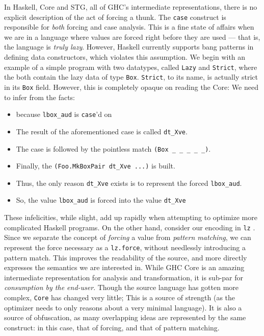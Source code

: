 \documentclass[sigplan,\review anonymous]{acmart}
\newcommand{\raw}[1]{\texttt{#1}}
\newcommand{\lz}{\texttt{lz} }
\newcommand{\core}{\texttt{Core} }
\begin{document}
In Haskell, Core and STG, all of GHC's intermediate representations, there is
no explicit description of the act of forcing a thunk. The \texttt{case} construct
is responsible for \emph{both} forcing and case analysis. This is a fine state
of affairs when we are in a language where values are forced right before they
are used --- that is, the language is \emph{truly lazy}. However, Haskell currently
supports bang patterns in defining data constructors, which violates this
assumption. We begin with an example of a simple program with two datatypes,
called \texttt{Lazy} and \texttt{Strict}, where the both contain the lazy data
of type \texttt{Box}. \texttt{Strict}, to its name, is actually strict
in its \texttt{Box} field. However, this is completely opaque on reading the
Core: We need to infer from the facts:
\begin{itemize}
\item because \raw{lbox_aud} is \texttt{case}'d on
\item The result of the aforementioned case is called \raw{dt_Xve}.
\item The case is followed by the pointless match \raw{(Box _ _ _ _ _)}.
\item Finally, the \raw{(Foo.MkBoxPair dt_Xve ...)} is built.
\item Thus, the only reason \raw{dt_Xve} exists is to represent the forced \raw{lbox_aud}.
\item So, the value \raw{lbox_aud} is forced into the value \raw{dt_Xve}
\end{itemize}

These infelicities, while slight, add up rapidly when attempting to optimize
more complicated Haskell programs. On the other hand, consider our encoding
in \lz. Since we separate the concept of \emph{forcing} a value from \emph{pattern matching},
we can represent the force necessary as a \texttt{lz.force}, without needlessly
introducing a pattern match. This improves the readability of the source, and
more directly expresses the semantics we are interested in.  While GHC Core
is an amazing intermediate representation for analysis and transformation, it
is sub-par for \emph{consumption by the end-user}. Though the source language has
gotten more complex, \core has changed very little; This is a source of
strength (as the optimizer needs to only reasons about a very minimal language).
It is also a source of obfuscation, as many overlapping ideas are represented
by the same construct: in this case, that of forcing, and that of pattern
matching.
\end{document}
